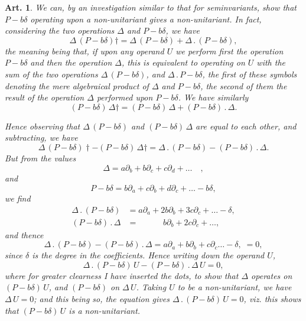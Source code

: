 \documentclass[11pt,a4paper]{article}
\theoremstyle{cayley}
\newtheorem{art}{Art.}[section]
\begin{document}
\setcounter{art}{26}
\begin{art}
We can, by an investigation similar to that for seminvariants, show that $P - b\delta$ operating upon a non-unitariant gives a non-unitariant. In fact, considering the two operations $\Delta$ and $P - b\delta$, we have
\[
\Delta\,(P - b\delta)\dagger = \Delta\,(P - b\delta) + \Delta\,.\,(P - b\delta),
\]
the meaning being that, if upon any operand $U$ we perform first the operation $P - b\delta$ and then the operation $\Delta$, this is equivalent to operating on $U$ with the sum of the two operations $\Delta\,(P - b\delta)$, and $\Delta\,.\,P - b\delta$, the first of these symbols denoting the mere algebraical product of $\Delta$ and $P - b\delta$, the second of them the result of the operation $\Delta$ performed upon $P - b\delta$. We have similarly
\[
(P - b\delta)\,\Delta\dagger = (P - b\delta)\,\Delta + (P - b\delta)\,.\,\Delta.
\]

Hence observing that $\Delta\,(P - b\delta)$ and $(P - b\delta)\,\Delta$ are equal to each other, and subtracting, we have
\[
\Delta\,(P - b\delta)\dagger - (P - b\delta)\,\Delta\dagger = \Delta\,.\,(P - b\delta) - (P - b\delta)\,.\,\Delta.
\]
But from the values
\[
\Delta = a\partial_{b} + b\partial_{c} + c\partial_{d} + \ldots\quad,
\]
and
\[
P - b\delta = b\partial_{a} + c\partial_{b} + d\partial_{c} + \ldots - b\delta,
\]
we find
\begin{align*}
\Delta\,.\,(P - b\delta) &= a\partial_{a} + 2b\partial_{b} + 3c\partial_{c} + \ldots - \delta,\\
(P - b\delta)\,.\,\Delta &= \phantom{a\partial_{a} +}\; b\partial_{b} + 2c\partial_{c} + \ldots,
\end{align*}
and thence
\[
\Delta\,.\,(P - b\delta) - (P - b\delta)\,.\,\Delta = a\partial_{a} + b\partial_{b} + c\partial_{c} \ldots - \delta,\; = 0,
\]
since $\delta$ is the degree in the coefficients. Hence writing down the operand $U$,
\[
\Delta\,.\,(P - b\delta)\,U - (P - b\delta)\,.\,\Delta\,U = 0,
\]
where for greater clearness I have inserted the dots, to show that $\Delta$ operates on $(P - b\delta)\,U$, and $(P - b\delta)$ on $\Delta\,U$. Taking $U$ to be a non-unitariant, we have $\Delta\,U = 0$; and this being so, the equation gives $\Delta\,.\,(P - b\delta)\,U = 0$, viz. this shows that $(P - b\delta)\,U$ is a non-unitariant.
\end{art}
\end{document}
